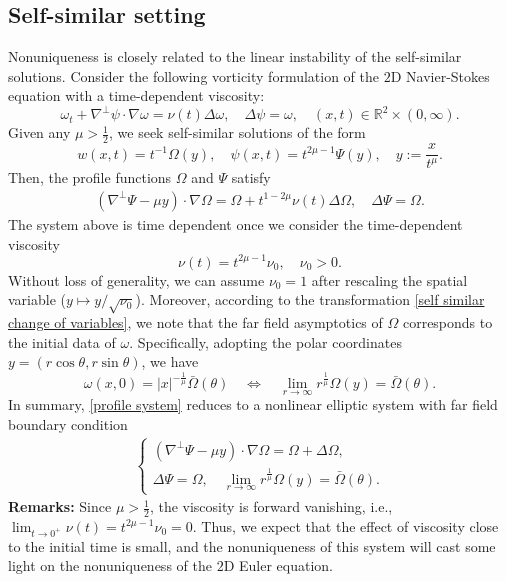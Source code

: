 \documentclass{article}
\newcommand{\reall}{\mathbb{R}}
\newcommand{\om}{\omega}
\numberwithin{equation}{section}
\begin{document}
\subsection{Self-similar setting}
Nonuniqueness is closely related to the linear instability of the self-similar solutions. Consider the following vorticity formulation of the $2$D Navier-Stokes equation with a time-dependent viscosity:
\begin{equation}\label{2D NS vorticity}
    \om_t + \nabla^\perp\psi\cdot\nabla\om = \nu(t)\Delta\om,\quad \Delta\psi = \om,\quad (x,t)\in\reall^2\times(0,\infty). \tag{NSt}
\end{equation}
Given any $\mu>\frac{1}{2}$, we seek self-similar solutions of the form
\begin{equation}\label{self similar change of variables}
    w(x,t) = t^{-1}\Omega(y),\quad \psi(x,t) = t^{2\mu-1}\Psi(y),\quad y:=\frac{x}{t^\mu}.
\end{equation}
Then, the profile functions $\Omega$ and $\Psi$ satisfy
\begin{align}\label{profile system}
    (\nabla^\perp\Psi-\mu y)\cdot\nabla\Omega = \Omega+t^{1-2\mu}\nu(t)\Delta\Omega,\quad \Delta\Psi = \Omega.
\end{align}
The system above is time dependent once we consider the time-dependent viscosity
\[
    \nu(t) = t^{2\mu-1}\nu_0,\quad \nu_0>0.
\]
Without loss of generality, we can assume $\nu_0=1$ after rescaling the spatial variable ($y\mapsto y/\sqrt{\nu_0}$).
Moreover, according to the transformation \eqref{self similar change of variables}, we note that the far field asymptotics of $\Omega$ corresponds to the initial data of $\om$. Specifically, adopting the polar coordinates $y = (r\cos\theta, r\sin\theta)$, we have
\[
    \om(x,0) = |x|^{-\frac{1}{\mu}}\bar\Omega(\theta)\quad \Longleftrightarrow\quad\lim_{r\to\infty}r^{\frac{1}{\mu}}\Omega(y) = \bar\Omega(\theta). 
\]
In summary, \eqref{profile system} reduces to a nonlinear elliptic system with far field boundary condition
\begin{align}\label{elliptic system with far field boundary condition}
\begin{cases}
    (\nabla^\perp\Psi-\mu y)\cdot\nabla\Omega = \Omega+\Delta\Omega,\\[4pt]
    \Delta\Psi = \Omega,\quad \lim_{r\to\infty}r^{\frac{1}{\mu}}\Omega(y) = \bar\Omega(\theta).
\end{cases}
\end{align}
\textbf{Remarks:} Since $\mu>\frac{1}{2}$, the viscosity is forward vanishing, i.e., $\lim_{t\to 0^+}\nu(t) = t^{2\mu-1}\nu_0=0$. Thus, we expect that the effect of viscosity close to the initial time is small, and the nonuniqueness of this system will cast some light on the nonuniqueness of the $2$D Euler equation. 
\end{document}
